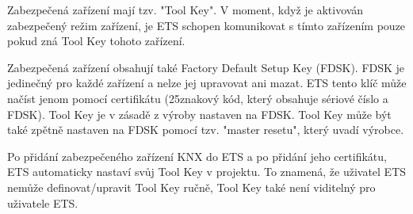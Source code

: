 Zabezpečená zařízení mají tzv. "Tool Key". V moment, když je aktivován zabezpečený režim zařízení, je ETS schopen komunikovat s tímto zařízením pouze pokud zná Tool Key tohoto zařízení.

Zabezpečená zařízení obsahují také Factory Default Setup Key (FDSK). FDSK je jedinečný pro každé zařízení a nelze jej upravovat ani mazat. ETS tento klíč může načíst jenom pomocí certifikátu (25znakový kód, který obsahuje sériové číslo a FDSK). Tool Key je v zásadě z výroby nastaven na FDSK. Tool Key může být také zpětně nastaven na FDSK pomocí tzv. "master resetu", který uvadí výrobce. 

Po přidání zabezpečeného zařízení KNX  do ETS a po přidání jeho certifikátu, ETS automaticky nastaví svůj Tool Key v projektu. To znamená, že uživatel ETS nemůže definovat/upravit Tool Key ručně, Tool Key také není viditelný pro uživatele ETS. \cite{KNX Secure}

